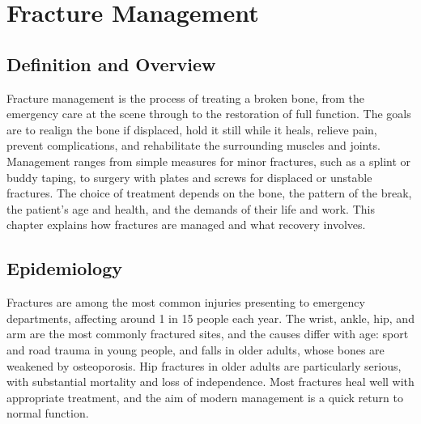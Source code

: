 \chapter{Fracture Management}

\section*{Definition and Overview}
Fracture management is the process of treating a broken bone, from the emergency care at the scene through to the restoration of full function. The goals are to realign the bone if displaced, hold it still while it heals, relieve pain, prevent complications, and rehabilitate the surrounding muscles and joints. Management ranges from simple measures for minor fractures, such as a splint or buddy taping, to surgery with plates and screws for displaced or unstable fractures. The choice of treatment depends on the bone, the pattern of the break, the patient's age and health, and the demands of their life and work. This chapter explains how fractures are managed and what recovery involves.

\section*{Epidemiology}
Fractures are among the most common injuries presenting to emergency departments, affecting around 1 in 15 people each year. The wrist, ankle, hip, and arm are the most commonly fractured sites, and the causes differ with age: sport and road trauma in young people, and falls in older adults, whose bones are weakened by osteoporosis. Hip fractures in older adults are particularly serious, with substantial mortality and loss of independence. Most fractures heal well with appropriate treatment, and the aim of modern management is a quick return to normal function.

